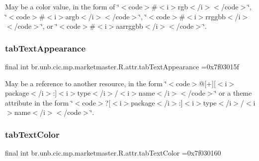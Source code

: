 May be a color value, in the form of \char`\"{}$<$code$>$\#$<$i$>$rgb$<$/i$>$$<$/code$>$\char`\"{}, \char`\"{}$<$code$>$\#$<$i$>$argb$<$/i$>$$<$/code$>$\char`\"{}, \char`\"{}$<$code$>$\#$<$i$>$rrggbb$<$/i$>$$<$/code$>$\char`\"{}, or \char`\"{}$<$code$>$\#$<$i$>$aarrggbb$<$/i$>$$<$/code$>$\char`\"{}. \mbox{\label{classbr_1_1unb_1_1cic_1_1mp_1_1marketmaster_1_1R_1_1attr_acdfd171b7a7eb92ebb0710a3dc2b051c}} 
\subsubsection{\texorpdfstring{tab\+Text\+Appearance}{tabTextAppearance}}
{\footnotesize\ttfamily final int br.\+unb.\+cic.\+mp.\+marketmaster.\+R.\+attr.\+tab\+Text\+Appearance =0x7f03015f\hspace{0.3cm}{\ttfamily [static]}}

May be a reference to another resource, in the form \char`\"{}$<$code$>$@\mbox{[}+\mbox{]}\mbox{[}$<$i$>$package$<$/i$>$\+:\mbox{]}$<$i$>$type$<$/i$>$/$<$i$>$name$<$/i$>$$<$/code$>$\char`\"{} or a theme attribute in the form \char`\"{}$<$code$>$?\mbox{[}$<$i$>$package$<$/i$>$\+:\mbox{]}$<$i$>$type$<$/i$>$/$<$i$>$name$<$/i$>$$<$/code$>$\char`\"{}. \mbox{\label{classbr_1_1unb_1_1cic_1_1mp_1_1marketmaster_1_1R_1_1attr_abbd894c3bfa76cacad45862a75e45673}} 
\subsubsection{\texorpdfstring{tab\+Text\+Color}{tabTextColor}}
{\footnotesize\ttfamily final int br.\+unb.\+cic.\+mp.\+marketmaster.\+R.\+attr.\+tab\+Text\+Color =0x7f030160\hspace{0.3cm}{\ttfamily [static]}}

